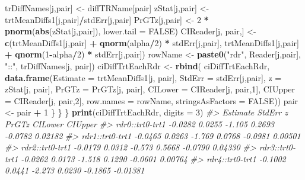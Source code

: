 \documentclass[
]{book}
\newenvironment{Shaded}{\begin{snugshade}}{\end{snugshade}}
\newcommand{\CommentTok}[1]{\textcolor[rgb]{0.56,0.35,0.01}{\textit{#1}}}
\newcommand{\DataTypeTok}[1]{\textcolor[rgb]{0.13,0.29,0.53}{#1}}
\newcommand{\DecValTok}[1]{\textcolor[rgb]{0.00,0.00,0.81}{#1}}
\newcommand{\KeywordTok}[1]{\textcolor[rgb]{0.13,0.29,0.53}{\textbf{#1}}}
\newcommand{\NormalTok}[1]{#1}
\newcommand{\OperatorTok}[1]{\textcolor[rgb]{0.81,0.36,0.00}{\textbf{#1}}}
\newcommand{\OtherTok}[1]{\textcolor[rgb]{0.56,0.35,0.01}{#1}}
\newcommand{\StringTok}[1]{\textcolor[rgb]{0.31,0.60,0.02}{#1}}
\begin{document}
\begin{Shaded}
\begin{Highlighting}[]
\NormalTok{      trDiffNames[j,pair] <-}\StringTok{ }\NormalTok{diffTRName[pair]}
\NormalTok{      zStat[j,pair] <-}\StringTok{ }\NormalTok{trtMeanDiffs1[j,pair]}\OperatorTok{/}\NormalTok{stdErr[j,pair]}
\NormalTok{      PrGTz[j,pair] <-}\StringTok{ }
\StringTok{        }\DecValTok{2} \OperatorTok{*}\StringTok{ }\KeywordTok{pnorm}\NormalTok{(}\KeywordTok{abs}\NormalTok{(zStat[j,pair]), }\DataTypeTok{lower.tail =} \OtherTok{FALSE}\NormalTok{)}
\NormalTok{      CIReader[j, pair,] <-}\StringTok{ }
\StringTok{        }\KeywordTok{c}\NormalTok{(trtMeanDiffs1[j,pair] }\OperatorTok{+}\StringTok{ }
\StringTok{            }\KeywordTok{qnorm}\NormalTok{(alpha}\OperatorTok{/}\DecValTok{2}\NormalTok{) }\OperatorTok{*}\StringTok{ }\NormalTok{stdErr[j,pair], }
\NormalTok{          trtMeanDiffs1[j,pair] }\OperatorTok{+}\StringTok{ }
\StringTok{            }\KeywordTok{qnorm}\NormalTok{(}\DecValTok{1}\OperatorTok{-}\NormalTok{alpha}\OperatorTok{/}\DecValTok{2}\NormalTok{) }\OperatorTok{*}\StringTok{ }\NormalTok{stdErr[j,pair])}
\NormalTok{      rowName <-}\StringTok{ }
\StringTok{        }\KeywordTok{paste0}\NormalTok{(}\StringTok{"rdr"}\NormalTok{, Reader[j,pair], }\StringTok{"::"}\NormalTok{, trDiffNames[j, pair])}
\NormalTok{      ciDiffTrtEachRdr <-}\StringTok{ }\KeywordTok{rbind}\NormalTok{(}
\NormalTok{        ciDiffTrtEachRdr, }
        \KeywordTok{data.frame}\NormalTok{(}\DataTypeTok{Estimate =}\NormalTok{ trtMeanDiffs1[j, pair], }
                   \DataTypeTok{StdErr =}\NormalTok{ stdErr[j,pair], }
                   \DataTypeTok{z =}\NormalTok{ zStat[j, pair], }
                   \DataTypeTok{PrGTz =}\NormalTok{ PrGTz[j, pair], }
                   \DataTypeTok{CILower =}\NormalTok{ CIReader[j, pair,}\DecValTok{1}\NormalTok{],}
                   \DataTypeTok{CIUpper =}\NormalTok{ CIReader[j, pair,}\DecValTok{2}\NormalTok{],}
                   \DataTypeTok{row.names =}\NormalTok{ rowName,}
                   \DataTypeTok{stringsAsFactors =} \OtherTok{FALSE}\NormalTok{))}
\NormalTok{      pair <-}\StringTok{ }\NormalTok{pair }\OperatorTok{+}\StringTok{ }\DecValTok{1}
\NormalTok{    \}}
\NormalTok{  \}}
\NormalTok{\}}
\KeywordTok{print}\NormalTok{(ciDiffTrtEachRdr, }\DataTypeTok{digits =} \DecValTok{3}\NormalTok{)}
\CommentTok{#>                 Estimate StdErr      z  PrGTz CILower  CIUpper}
\CommentTok{#> rdr0::trt0-trt1  -0.0282 0.0255 -1.105 0.2693 -0.0782  0.02182}
\CommentTok{#> rdr1::trt0-trt1  -0.0465 0.0263 -1.769 0.0768 -0.0981  0.00501}
\CommentTok{#> rdr2::trt0-trt1  -0.0179 0.0312 -0.573 0.5668 -0.0790  0.04330}
\CommentTok{#> rdr3::trt0-trt1  -0.0262 0.0173 -1.518 0.1290 -0.0601  0.00764}
\CommentTok{#> rdr4::trt0-trt1  -0.1002 0.0441 -2.273 0.0230 -0.1865 -0.01381}
\end{Highlighting}
\end{Shaded}
\end{document}

